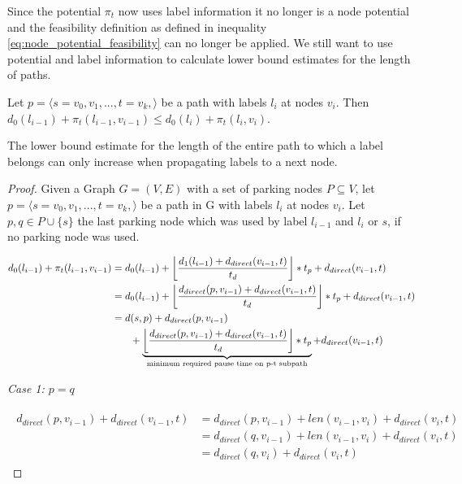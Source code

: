 Since the potential $\pi_t$ now uses label information it no longer is a node potential and the feasibility definition as defined in inequality \ref{eq:node_potential_feasibility} can no longer be applied. We still want to use potential and label information to calculate lower bound estimates for the length of paths.

\begin{lemma}
	Let $p = \langle s=v_0,v_1,...,t=v_k, \rangle$ be a path with labels $l_i$ at nodes $v_i$. Then $d_0(l_{i-1}) + \pi_t(l_{i-1},v_{i-1}) \le d_0(l_i) + \pi_t(l_i,v_i)$.
\end{lemma}

The lower bound estimate for the length of the entire path to which a label belongs can only increase when propagating labels to a next node.

\begin{proof}
	Given a Graph $G=(V,E)$ with a set of parking nodes $P \subseteq V$, let $p = \langle s=v_0,v_1,...,t=v_k, \rangle$ be a path in G with labels $l_i$ at nodes $v_i$. Let $p,q \in P \cup \{s\}$ the last parking node which was used by label $l_{i-1}$ and $l_{i}$ or $s$, if no parking node was used.

	\begin{align}
		\begin{split}\label{eq:label_feasibility_proof_1}
			d_0(l_{i-1}) + \pi_t(l_{i-1},v_{i-1}) &= d_0(l_{i-1})+\floor*{ \frac{d_1(l_{i-1}) + d_{direct}(v_{i-1},t)}{t_d} } * t_p + d_{direct}(v_{i-1},t)\\
			&= d_0(l_{i-1})+ \floor*{ \frac{d_{direct}(p,v_{i-1}) + d_{direct}(v_{i-1},t)}{t_d} } * t_p + d_{direct}(v_{i-1},t)\\
			&=d(s,p) + d_{direct}(p,v_{i-1})\\
			& \phantom{{}=1} + \underbrace{\floor*{ \frac{d_{direct}(p,v_{i-1}) + d_{direct}(v_{i-1},t)}{t_d} } * t_p}_\text{minimum required pause time on p-t subpath} + d_{direct}(v_{i-1},t)
		\end{split}
	\end{align}

	\emph{Case 1: $p=q$}

	\begin{align}
		\begin{split}\label{eq:label_feasibility_proof_2}
			d_{direct}(p,v_{i-1}) + d_{direct}(v_{i-1},t) & = d_{direct}(p,v_{i-1}) + len(v_{i-1},v_i) + d_{direct}(v_i,t) \\
			& = d_{direct}(q,v_{i-1}) + len(v_{i-1},v_i) + d_{direct}(v_i,t) \\
			& = d_{direct}(q,v_i) + d_{direct}(v_i,t)
		\end{split}
	\end{align}


\end{proof}
